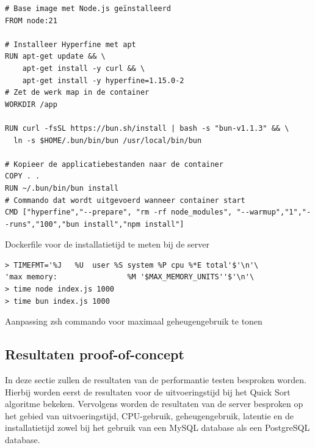 \begin{listing}[H]
  \centering
  \begin{verbatim}
# Base image met Node.js geïnstalleerd
FROM node:21

# Installeer Hyperfine met apt
RUN apt-get update && \
    apt-get install -y curl && \
    apt-get install -y hyperfine=1.15.0-2
# Zet de werk map in de container
WORKDIR /app

RUN curl -fsSL https://bun.sh/install | bash -s "bun-v1.1.3" && \
  ln -s $HOME/.bun/bin/bun /usr/local/bin/bun

# Kopieer de applicatiebestanden naar de container
COPY . .
RUN ~/.bun/bin/bun install
# Commando dat wordt uitgevoerd wanneer container start
CMD ["hyperfine","--prepare", "rm -rf node_modules", "--warmup","1","--runs","100","bun install","npm install"]
      \end{verbatim}
      \caption{\label{code:dockerinstall}Dockerfile voor de installatietijd te meten bij de server}
\end{listing}

\begin{listing}[H]
  \centering
  \begin{verbatim}
> TIMEFMT='%J   %U  user %S system %P cpu %*E total'$'\n'\
'max memory:                %M '$MAX_MEMORY_UNITS''$'\n'\
> time node index.js 1000
> time bun index.js 1000
      \end{verbatim}
      \caption{\label{code:zshmemory}Aanpassing zsh commando voor maximaal geheugengebruik te tonen}
\end{listing}

\subsection{Resultaten proof-of-concept}
In deze sectie zullen de resultaten van de performantie testen besproken worden.
Hierbij worden eerst de resultaten voor de uitvoeringstijd bij het Quick Sort algoritme bekeken.
Vervolgens worden de resultaten van de server besproken op het gebied van uitvoeringstijd, CPU-gebruik, geheugengebruik, latentie en de installatietijd
zowel bij het gebruik van een MySQL database als een PostgreSQL database.

